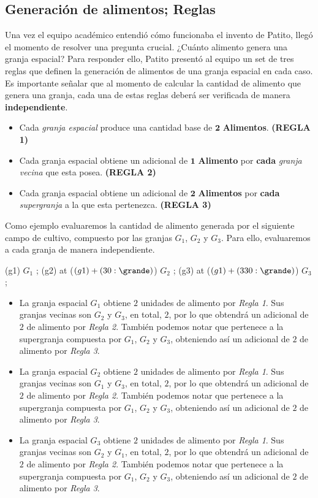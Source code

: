 \subsection*{Generación de alimentos; Reglas}

Una vez el equipo académico entendió cómo funcionaba el invento de Patito, llegó el momento de resolver una pregunta crucial. ¿Cuánto alimento %
genera una granja espacial? Para responder ello, Patito presentó al equipo un set de tres reglas que definen la generación de alimentos de una granja espacial %
en cada caso. Es importante señalar que al momento de calcular la cantidad de alimento que genera una granja, cada una de estas reglas deberá ser verificada %
de manera \textbf{independiente}.

\begin{itemize}
\item Cada \emph{granja espacial} produce una cantidad base de $\mathbf{2}$ \textbf{Alimentos}. \textbf{(REGLA 1)}
\item Cada granja espacial obtiene un adicional de $\mathbf{1}$ \textbf{Alimento} por \textbf{cada} \emph{granja vecina} que esta posea. \textbf{(REGLA 2)}
\item Cada granja espacial obtiene un adicional de $\mathbf{2}$ \textbf{Alimentos} por \textbf{cada} \emph{supergranja} a la que esta pertenezca. \textbf{(REGLA 3)}
\end{itemize}

\noindent Como ejemplo evaluaremos la cantidad de alimento generada por el siguiente campo de cultivo, compuesto por las granjas $G_1$, $G_2$ y $G_3$. Para ello, %
evaluaremos a cada granja de manera independiente.

\cultivo
\granja (g1) {$G_1$} ;
\granja (g2) at ($(g1) + (30:\grande)$) {$G_2$} ;
\granja (g3) at ($(g1) + (330:\grande)$) {$G_3$} ;
\fin

\begin{itemize}
\item La granja espacial $G_1$ obtiene $2$ unidades de alimento por \emph{Regla 1}. Sus granjas vecinas son $G_2$ y $G_3$, en total, $2$, por lo que obtendrá un adicional %
de $2$ de alimento por \emph{Regla 2}. También podemos notar que pertenece a la supergranja compuesta por $G_1$, $G_2$ y $G_3$, obteniendo así un adicional de $2$ de alimento %
por \emph{Regla 3}.
\item La granja espacial $G_2$ obtiene $2$ unidades de alimento por \emph{Regla 1}. Sus granjas vecinas son $G_1$ y $G_3$, en total, $2$, por lo que obtendrá un adicional %
de $2$ de alimento por \emph{Regla 2}. También podemos notar que pertenece a la supergranja compuesta por $G_1$, $G_2$ y $G_3$, obteniendo así un adicional de $2$ de alimento %
por \emph{Regla 3}.
\item La granja espacial $G_3$ obtiene $2$ unidades de alimento por \emph{Regla 1}. Sus granjas vecinas son $G_2$ y $G_1$, en total, $2$, por lo que obtendrá un adicional %
de $2$ de alimento por \emph{Regla 2}. También podemos notar que pertenece a la supergranja compuesta por $G_1$, $G_2$ y $G_3$, obteniendo así un adicional de $2$ de alimento %
por \emph{Regla 3}.
\end{itemize}


